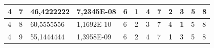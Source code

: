 \documentclass[conference]{IEEEtran}
\begin{document}
\begin{table}[]
\begin{tabular}{|llll|llllllll|}
\multicolumn{1}{|l|}{4}                                                     & \multicolumn{1}{l|}{7}                                                        & \multicolumn{1}{l|}{46,4222222}                                                   & 7,2345E-08                     & \multicolumn{1}{l|}{6}                                                  & \multicolumn{1}{l|}{\textbf{1}}                                         & \multicolumn{1}{l|}{4}                                                  & \multicolumn{1}{l|}{7}                                                  & \multicolumn{1}{l|}{2}                                                  & \multicolumn{1}{l|}{3}                                                  & \multicolumn{1}{l|}{5}                                                  & 8                          \\ \hline
\multicolumn{1}{|l|}{4}                                                     & \multicolumn{1}{l|}{8}                                                        & \multicolumn{1}{l|}{60,5555556}                                                   & 1,1692E-10                     & \multicolumn{1}{l|}{6}                                                  & \multicolumn{1}{l|}{2}                                                  & \multicolumn{1}{l|}{3}                                                  & \multicolumn{1}{l|}{7}                                                  & \multicolumn{1}{l|}{4}                                                  & \multicolumn{1}{l|}{\textbf{1}}                                         & \multicolumn{1}{l|}{5}                                                  & 8                          \\ \hline
\multicolumn{1}{|l|}{4}                                                     & \multicolumn{1}{l|}{9}                                                        & \multicolumn{1}{l|}{55,1444444}                                                   & 1,3958E-09                     & \multicolumn{1}{l|}{6}                                                  & \multicolumn{1}{l|}{2}                                                  & \multicolumn{1}{l|}{4}                                                  & \multicolumn{1}{l|}{7}                                                  & \multicolumn{1}{l|}{\textbf{1}}                                         & \multicolumn{1}{l|}{3}                                                  & \multicolumn{1}{l|}{5}                                                  & 8                          \\ \hline

\end{tabular}
\end{table}
\end{document}
